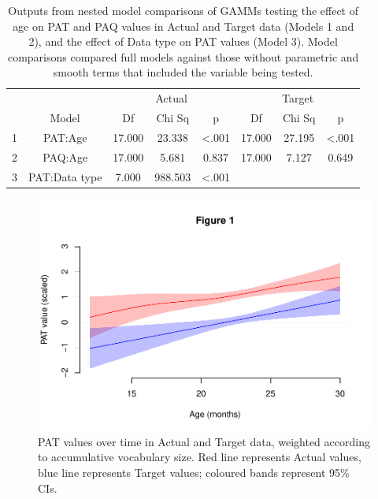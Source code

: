 \documentclass[
  man]{apa6}
\begin{document}
\begin{longtable}[t]{cccccccc}
\caption{\label{tab:table-GAMM-outputs}Outputs from nested model comparisons of GAMMs testing the effect of age on PAT and PAQ values in Actual and Target data (Models 1 and 2), and the effect of Data type on PAT values (Model 3). Model comparisons compared full models against those without parametric and smooth terms that included the variable being tested.}\\
\toprule
\multicolumn{2}{c}{ } & \multicolumn{3}{c}{Actual} & \multicolumn{3}{c}{Target} \\
\cmidrule(l{3pt}r{3pt}){3-5} \cmidrule(l{3pt}r{3pt}){6-8}
  & Model & Df & Chi Sq & p & Df & Chi Sq & p\\
\midrule
1 & PAT:Age & 17.000 & 23.338 & <.001 & 17.000 & 27.195 & <.001\\
2 & PAQ:Age & 17.000 & 5.681 & 0.837 & 17.000 & 7.127 & 0.649\\
3 & PAT:Data type & 7.000 & 988.503 & <.001 &  &  & \\
\bottomrule
\end{longtable}

\begin{figure}
\centering
\includegraphics{PhonNetworksProj_files/figure-latex/figure-GAMM-PAT-1.pdf}
\caption{\label{fig:figure-GAMM-PAT}PAT values over time in Actual and Target data, weighted according to accumulative vocabulary size. Red line represents Actual values, blue line represents Target values; coloured bands represent 95\% CIs.}
\end{figure}
\end{document}
